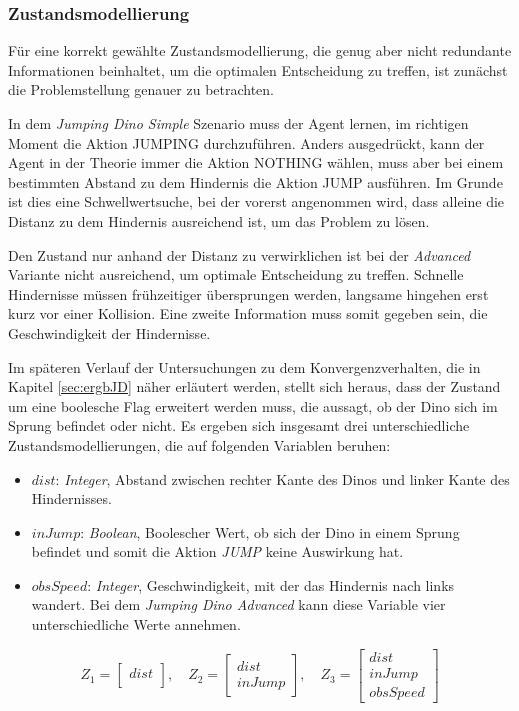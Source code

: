 \subsubsection{Zustandsmodellierung}\label{sec:JDzustandsmodellierung}
Für eine korrekt gewählte Zustandsmodellierung, die genug aber nicht redundante Informationen beinhaltet, um die optimalen Entscheidung zu treffen, ist zunächst die Problemstellung genauer zu betrachten. 
\par 
In dem \textit{Jumping Dino Simple} Szenario muss der Agent lernen, im richtigen Moment die Aktion JUMPING durchzuführen. Anders ausgedrückt, kann der Agent in der Theorie immer die Aktion NOTHING wählen, muss aber bei einem bestimmten Abstand zu dem Hindernis die Aktion JUMP ausführen. Im Grunde ist dies eine Schwellwertsuche, bei der vorerst angenommen wird, dass alleine die Distanz zu dem Hindernis ausreichend ist, um das Problem zu lösen.
\par 
Den Zustand nur anhand der Distanz zu verwirklichen ist bei der \textit{Advanced} Variante nicht ausreichend, um optimale Entscheidung zu treffen. Schnelle Hindernisse müssen frühzeitiger übersprungen werden, langsame hingehen erst kurz vor einer Kollision. Eine zweite Information muss somit gegeben sein, die Geschwindigkeit der Hindernisse.
\par 
Im späteren Verlauf der Untersuchungen zu dem Konvergenzverhalten, die in Kapitel \ref{sec:ergbJD} näher erläutert werden, stellt sich heraus, dass der Zustand um eine boolesche Flag erweitert werden muss, die aussagt, ob der Dino sich im Sprung befindet oder nicht. 
Es ergeben sich insgesamt drei unterschiedliche Zustandsmodellierungen, die auf folgenden Variablen beruhen:
\begin{itemize}
 \item $dist$: \textit{Integer}, Abstand zwischen rechter Kante des Dinos und  linker Kante des Hindernisses.
 \item $inJump$: \textit{Boolean}, Boolescher Wert, ob sich der Dino in einem Sprung befindet und somit die Aktion \textit{JUMP} keine Auswirkung hat.
 \item $obsSpeed$: \textit{Integer}, Geschwindigkeit, mit der das Hindernis nach links wandert. Bei dem \textit{Jumping Dino Advanced} kann diese Variable vier unterschiedliche Werte annehmen.    
\end{itemize}
\begin{equation}
    Z_{1} =  \begin{bmatrix} dist\\   \end{bmatrix}, \quad
    Z_{2} =  \begin{bmatrix} dist \\ inJump   \end{bmatrix}, \quad
    Z_{3} =  \begin{bmatrix} dist \\ inJump \\ obsSpeed   \end{bmatrix}
\end{equation}


